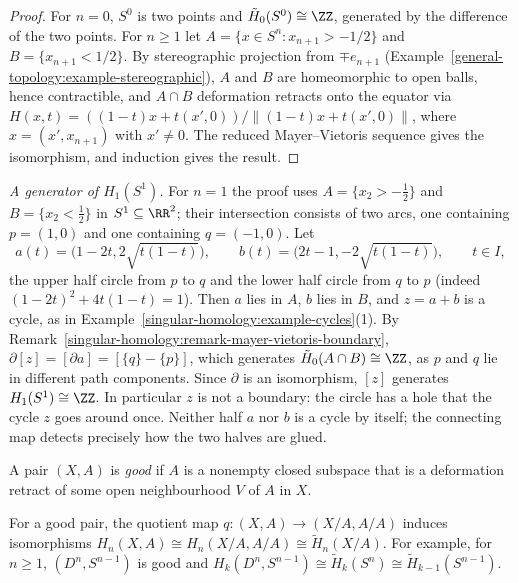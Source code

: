 \begin{proof}
For $n = 0$, $S^0$ is two points and $\tilde{H}_0(S^0) \cong \ZZ$, generated by the difference of the two points. For $n \geq 1$ let
$A = \{x \in S^n : x_{n+1} > -1/2\}$ and $B = \{x_{n+1} < 1/2\}$. By stereographic projection from $\mp e_{n+1}$ (Example~\ref{general-topology:example-stereographic}), $A$ and
$B$ are homeomorphic to open balls, hence contractible, and $A \cap B$ deformation retracts onto the equator via
$H(x, t) = ((1 - t)x + t(x', 0))/\|(1 - t)x + t(x', 0)\|$, where $x = (x', x_{n+1})$ with $x' \neq 0$. The reduced Mayer--Vietoris sequence gives the
isomorphism, and induction gives the result.
\end{proof}

\begin{example}\label{singular-homology:example-circle-generator}
\emph{A generator of $H_1(S^1)$.} For $n = 1$ the proof uses $A = \{x_2 > -\frac12\}$ and $B = \{x_2 < \frac12\}$ in $S^1 \subseteq \RR^2$; their intersection consists of two
arcs, one containing $p = (1, 0)$ and one containing $q = (-1, 0)$. Let
\[
a(t) = \bigl(1 - 2t, 2\sqrt{t(1 - t)}\bigr), \qquad b(t) = \bigl(2t - 1, -2\sqrt{t(1 - t)}\bigr), \qquad t \in I,
\]
the upper half circle from $p$ to $q$ and the lower half circle from $q$ to $p$ (indeed $(1 - 2t)^2 + 4t(1 - t) = 1$). Then $a$ lies in $A$, $b$ lies in $B$, and $z = a + b$
is a cycle, as in Example~\ref{singular-homology:example-cycles}(1). By Remark~\ref{singular-homology:remark-mayer-vietoris-boundary}, $\partial[z] = [\partial a] = [\{q\} - \{p\}]$,
which generates $\tilde{H}_0(A \cap B) \cong \ZZ$, as $p$ and $q$ lie in different path components. Since $\partial$ is an isomorphism, $[z]$ generates $H_1(S^1) \cong \ZZ$. In
particular $z$ is not a boundary: the circle has a hole that the cycle $z$ goes around once. Neither half $a$ nor $b$ is a cycle by itself; the connecting map
detects precisely how the two halves are glued.
\end{example}

\begin{definition}\label{singular-homology:definition-good-pair}
A pair $(X, A)$ is \emph{good} if $A$ is a nonempty closed subspace that is a deformation retract of some open neighbourhood $V$ of $A$ in $X$.
\end{definition}

\begin{proposition}\label{singular-homology:proposition-good-pair}
For a good pair, the quotient map $q \colon (X, A) \to (X/A, A/A)$ induces isomorphisms $H_n(X, A) \cong H_n(X/A, A/A) \cong \tilde{H}_n(X/A)$. For example, for $n \geq 1$,
$(D^n, S^{n-1})$ is good and $H_k(D^n, S^{n-1}) \cong \tilde{H}_k(S^n) \cong \tilde{H}_{k-1}(S^{n-1})$.
\end{proposition}

